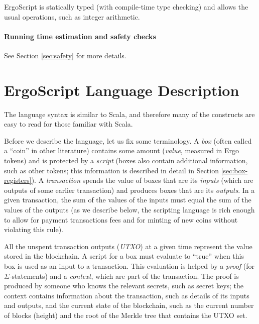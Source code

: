\documentclass[11pt]{article}
\newcommand{\authnote}[2]{\marginpar{\parbox{\marginparwidth}{\tiny %
  \textsf{#1 {\textcolor{blue}{notes: #2}}}}}%
  \textcolor{blue}{\textbf{\dag}}}
\newcommand{\authnote}[2]{
  \textsf{#1 \textcolor{blue}{: #2}}}
\newcommand{\authnote}[2]{}
\newcommand{\lnote}[1]{{\authnote{\textcolor{orange}{Leo notes}}{#1}}}
\newcommand{\dnote}[1]{{\authnote{\textcolor{brown}{Dima notes}}{#1}}}
\newcommand{\langname}{ErgoScript\xspace}
\begin{document}
\langname is statically typed (with compile-time type checking) and allows the usual operations, such as integer arithmetic.

\paragraph{Running time estimation and safety checks}
\lnote{someone should fill this in, because I know very little about it}
See Section \ref{sec:safety} for more details.





\section{\langname Language Description}

\lnote{Should we add, for every code example, a link to the code where it appears? That would help the reader.}

The language syntax is similar to Scala, and therefore many of the constructs are easy to read for those familiar with Scala. 

Before we describe the language, let us fix some terminology. A \emph{box} (often called a ``coin'' in other literature) contains some amount (\emph{value}, measured in Ergo tokens) and is protected by a \emph{script} (boxes also contain additional information, such as other tokens; this information is described in detail in Section \ref{sec:box-registers}). A \emph{transaction} spends the value of boxes that are its \emph{inputs} (which are outputs of some earlier transaction) and produces boxes that are its \emph{outputs}. In a given transaction, the sum of the values of the inputs must equal the sum of the values of the outputs (as we describe below, the scripting language is rich enough to allow for payment transactions fees and for minting of new coins without violating this rule).


All the unspent transaction outputs (\emph{UTXO}) at a given time represent the value stored in the blockchain. A script for a box must evaluate to ``true'' when this box is used as an input to a transaction. This evaluation is helped by a \emph{proof} (for $\Sigma$-statements) and a \emph{context}, which are part of the transaction. The proof is produced by someone who knows the relevant secrets, such as secret keys; the context contains information about the transaction, such as details of its inputs and outputs, and the current state of the blockchain, such as the current number of blocks (height) and the root of the Merkle tree that contains the UTXO set.
\dnote{This should change in future, e.g. fixed number of last headers is going to be added here (and header contains height and root hash).} \lnote{adjust this as needed}
\end{document}
